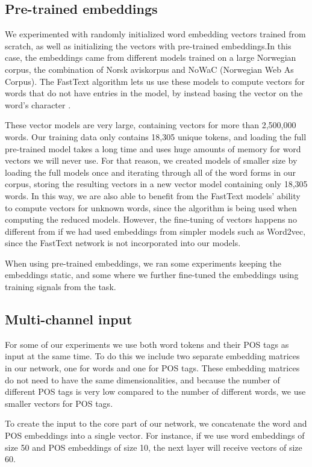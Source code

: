 \subsection{Pre-trained embeddings}

We experimented with randomly initialized word embedding vectors trained from
scratch, as well as initializing the vectors with pre-trained embeddings.In
this case, the embeddings came from different models trained on a large
Norwegian corpus, the combination of Norsk aviskorpus and NoWaC (Norwegian
Web As Corpus). The FastText algorithm lets us use these models to compute
vectors for words that do not have entries in the model, by instead basing
the vector on the word's character \ngrams.

These vector models are very large, containing vectors for more than
2,500,000 words. Our training data only contains 18,305 unique tokens, and
loading the full pre-trained model takes a long time and uses huge amounts of
memory for word vectors we will never use. For that reason, we created models
of smaller size by loading the full models once and iterating through all of
the word forms in our corpus, storing the resulting vectors in a new vector
model containing only 18,305 words. In this way, we are also able to benefit
from the FastText models' ability to compute vectors for unknown words, since
the \ngram algorithm is being used when computing the reduced models.
However, the fine-tuning of vectors happens no different from if we had used
embeddings from simpler models such as Word2vec, since the FastText network
is not incorporated into our models.

When using pre-trained embeddings, we ran some experiments keeping the
embeddings static, and some where we further fine-tuned the embeddings using
training signals from the task.

\subsection{Multi-channel input}

For some of our experiments we use both word tokens and their POS tags as
input at the same time. To do this we include two separate embedding matrices
in our network, one for words and one for POS tags. These embedding matrices
do not need to have the same dimensionalities, and because the number of
different POS tags is very low compared to the number of different words, we
use smaller vectors for POS tags.

To create the input to the core part of our network, we concatenate the word
and POS embeddings into a single vector. For instance, if we use word
embeddings of size 50 and POS embeddings of size 10, the next layer will
receive vectors of size 60.


